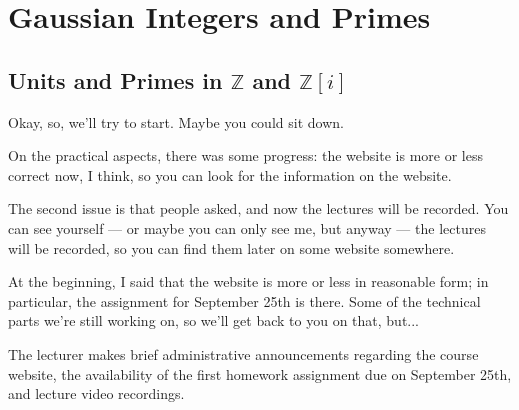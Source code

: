 \section{Gaussian Integers and Primes}
\subsection{Units and Primes in \texorpdfstring{$\mathbb{Z}$}{Z} and \texorpdfstring{$\mathbb{Z}[i]$}{Z[i]}}

\begin{speech}[00:00:00 - 00:00:53]
Okay, so, we'll try to start. Maybe you could sit down.

On the practical aspects, there was some progress: the website is more or less correct now, I think, so you can look for the information on the website.

The second issue is that people asked, and now the lectures will be recorded. You can see yourself --- or maybe you can only see me, but anyway --- the lectures will be recorded, so you can find them later on some website somewhere.

At the beginning, I said that the website is more or less in reasonable form; in particular, the assignment for September 25th is there. Some of the technical parts we're still working on, so we'll get back to you on that, but...
\end{speech}

\begin{note}
The lecturer makes brief administrative announcements regarding the course website, the availability of the first homework assignment due on September 25th, and lecture video recordings.
\end{note}

